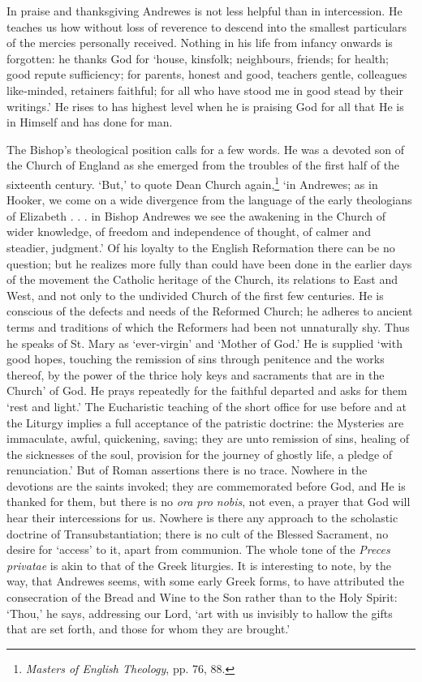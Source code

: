 In praise and thanksgiving Andrewes is not less helpful than in intercession. He teaches us how without loss of reverence to descend into the smallest particulars of the mercies personally received. Nothing in his life from infancy onwards is forgotten: he thanks God for ‘house, kinsfolk; neighbours, friends; for health; good repute sufficiency; for parents, honest and good, teachers gentle, colleagues like‑minded, retainers faithful; for all who have stood me in good stead by their writings.’ He rises to has highest level when he is praising God for all that He is in Himself and has done for man.

The Bishop’s theological position calls for a few words. He was a devoted son of the Church of England as she emerged from the troubles of the first half of the sixteenth century. ‘But,’ to quote Dean Church again,\footnote{\emph{Masters of English Theology}, pp. 76, 88.} ‘in Andrewes; as in Hooker, we come on a wide divergence from the language of the early theologians of Elizabeth . . . in Bishop Andrewes we see the awakening in the Church of wider knowledge, of freedom and independence of thought, of calmer and steadier, judgment.’ Of his loyalty to the English Reformation there can be no question; but he realizes more fully than could have been done in the earlier days of the movement the Catholic heritage of the Church, its relations to East and West, and not only to the undivided Church of the first few centuries. He is conscious of the defects and needs of the Reformed  Church; he adheres to ancient terms and traditions of which the Reformers had been not unnaturally shy. Thus he speaks of St. Mary as ‘ever‑virgin’ and ‘Mother of God.’ He is supplied ‘with good hopes, touching the remission of sins through penitence and the works thereof, by the power of the thrice holy keys and sacraments that are in the Church’ of God. He prays repeatedly for the faithful departed and asks for them ‘rest and light.’ The Eucharistic teaching of the short office for use before and at the Liturgy implies a full acceptance of the patristic doctrine: the Mysteries are immaculate, awful, quickening, saving; they are unto remission of sins, healing of the sicknesses of the soul, provision for the journey of ghostly life, a pledge of renunciation.’ But of Roman assertions there is no trace. Nowhere in the devotions are the saints invoked; they are commemorated before God, and He is thanked for them, but there is no \emph{ora pro nobis}, not even, a prayer that God will hear their intercessions for us. Nowhere is there any approach to the scholastic doctrine of Transubstantiation; there is no cult of the Blessed Sacrament, no desire for ‘access’ to it, apart from communion. The whole tone of the \emph{Preces privatae} is akin to that of the Greek liturgies. It is interesting to note, by the way, that Andrewes seems, with some early Greek forms, to have attributed the consecration of the Bread and Wine to the Son rather than to the Holy Spirit: ‘Thou,’ he says, addressing our Lord, ‘art with us invisibly to hallow the gifts that are set forth, and those for whom they are brought.’

